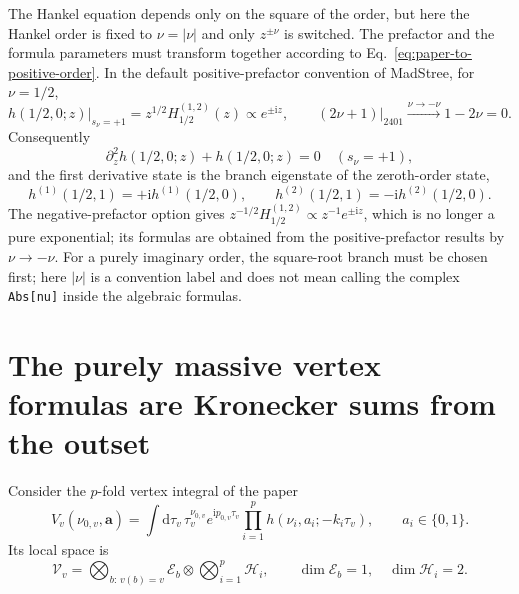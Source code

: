 \documentclass[11pt,a4paper]{article}
\newcommand{\dd}{\mathrm d}
\newcommand{\ii}{\mathrm i}
\newcommand{\cV}{\mathcal V}
\newcommand{\cE}{\mathcal E}
\newcommand{\cH}{\mathcal H}
\begin{document}
The Hankel equation depends only on the square of the order, but here the Hankel order is fixed to $\nu=|\nu|$ and only $z^{\pm\nu}$ is switched. The prefactor and the formula parameters must transform together according to Eq.~\eqref{eq:paper-to-positive-order}. In the default positive-prefactor convention of MadStree, for $\nu=1/2$,
\begin{equation}
 h(1/2,0;z)\big|_{s_\nu=+1}=z^{1/2}H_{1/2}^{(1,2)}(z)
 \propto e^{\pm\ii z},
 \qquad
 \left.(2\nu+1)\right|_{2401}\xrightarrow{\nu\to-\nu}1-2\nu=0.
 \label{eq:massless-h-eigenstate}
\end{equation}
Consequently
\begin{equation}
 \partial_z^2h(1/2,0;z)+h(1/2,0;z)=0\quad(s_\nu=+1),
 \label{eq:massless-z-eom}
\end{equation}
and the first derivative state is the branch eigenstate of the zeroth-order state,
\begin{equation}
 h^{(1)}(1/2,1)=+\ii h^{(1)}(1/2,0),
 \qquad
 h^{(2)}(1/2,1)=-\ii h^{(2)}(1/2,0).
 \label{eq:h-branch-eigenvalues}
\end{equation}
The negative-prefactor option gives $z^{-1/2}H_{1/2}^{(1,2)}\propto z^{-1}e^{\pm\ii z}$, which is no longer a pure exponential; its formulas are obtained from the positive-prefactor results by $\nu\to-\nu$. For a purely imaginary order, the square-root branch must be chosen first; here $|\nu|$ is a convention label and does not mean calling the complex \texttt{Abs[nu]} inside the algebraic formulas.

\section{The purely massive vertex formulas are Kronecker sums from the outset}

Consider the $p$-fold vertex integral of the paper
\begin{equation}
 V_v(\nu_{0,v},\bm a)
 =\int\dd\tau_v\,
 \tau_v^{\nu_{0,v}}e^{\ii p_{0,v}\tau_v}
 \prod_{i=1}^{p}h(\nu_i,a_i;-k_i\tau_v),
 \qquad a_i\in\{0,1\}.
\end{equation}
Its local space is
\begin{equation}
 \cV_v
 =\bigotimes_{b:\,v(b)=v}\cE_b
 \otimes\bigotimes_{i=1}^{p}\cH_i,
 \qquad
 \dim\cE_b=1,
 \quad
 \dim\cH_i=2.
 \label{eq:vertex-tensor-space}
\end{equation}
\end{document}
